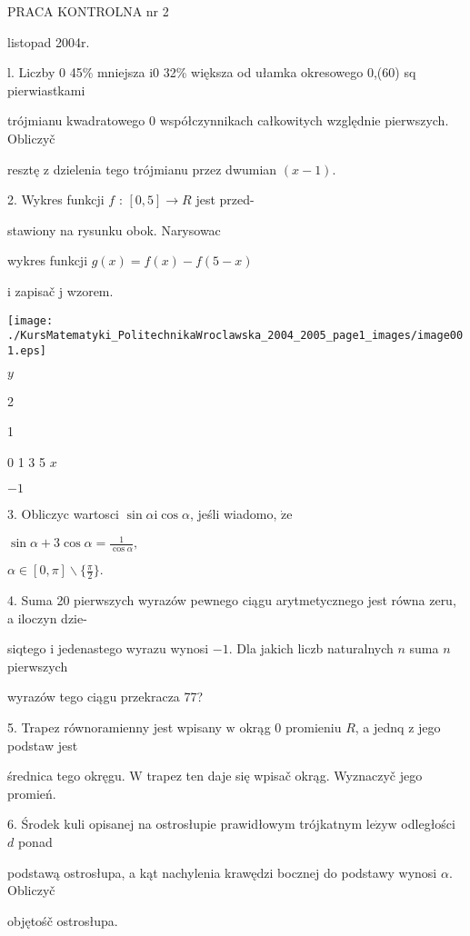 \documentclass[a4paper,12pt]{article}
\begin{document}
PRACA KONTROLNA nr 2

listopad 2004r.

l. Liczby $0$ 45\% mniejsza $\mathrm{i} 0$ 32\% większa od ułamka okresowego 0,(60) sq pierwiastkami

trójmianu kwadratowego $0$ współczynnikach całkowitych względnie pierwszych. Obliczyč

resztę $\mathrm{z}$ dzielenia tego trójmianu przez dwumian $(x-1).$

2. Wykres funkcji $f$ : $[0,5]\rightarrow R$ jest przed-

stawiony na rysunku obok. Narysowac

wykres funkcji $g(x)=f(x)-f(5-x)$

$\mathrm{i}$ zapisač $\mathrm{j}$ wzorem.
\begin{center}
\texttt{[image: ./KursMatematyki\_PolitechnikaWroclawska\_2004\_2005\_page1\_images/image001.eps]}
\end{center}
$y$

2

1

0 1 3 5 $x$

$-1$

3. Obliczyc wartosci $\sin\alpha \mathrm{i}\cos\alpha$, jeśli wiadomo, $\dot{\mathrm{z}}\mathrm{e}$

$\displaystyle \sin\alpha+3\cos\alpha=\frac{1}{\cos\alpha},$

$\displaystyle \alpha\in[0,\pi]\backslash \{\frac{\pi}{2}\}.$

4. Suma 20 pierwszych wyrazów pewnego ciągu arytmetycznego jest równa zeru, a iloczyn dzie-

siqtego $\mathrm{i}$ jedenastego wyrazu wynosi $-1$. Dla jakich liczb naturalnych $n$ suma $n$ pierwszych

wyrazów tego ciągu przekracza 77?

5. Trapez równoramienny jest wpisany $\mathrm{w}$ okrąg $0$ promieniu $R$, a jednq $\mathrm{z}$ jego podstaw jest

średnica tego okręgu. $\mathrm{W}$ trapez ten daje się wpisač okrąg. Wyznaczyč jego promień.

6. Środek kuli opisanej na ostrosłupie prawidłowym trójkatnym $\mathrm{l}\mathrm{e}\dot{\mathrm{z}}\mathrm{y}\mathrm{w}$ odległości $d$ ponad

podstawą ostrosłupa, a kąt nachylenia krawędzi bocznej do podstawy wynosi $\alpha$. Obliczyč

objętośč ostrosłupa.
\end{document}
